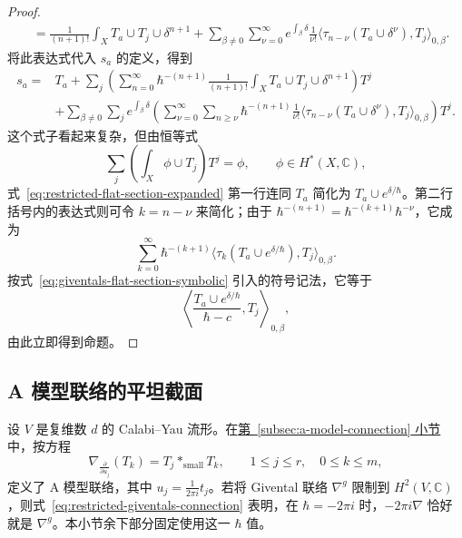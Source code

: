 \begin{proof}
\[\begin{aligned}
&=\frac1{(n+1)!}\int_XT_a\cup T_j\cup\delta^{n+1}
+\sum_{\beta\ne0}\sum_{\nu=0}^{\infty}
e^{\int_\beta\delta}\frac1{\nu!}
\langle\tau_{n-\nu}(T_a\cup\delta^\nu),T_j\rangle_{0,\beta}.
\end{aligned}
\]
将此表达式代入 $s_a$ 的定义，得到
\begin{equation}\label{eq:restricted-flat-section-expanded}
\begin{aligned}
s_a={}&T_a+\sum_j\left(\sum_{n=0}^{\infty}\hbar^{-(n+1)}
\frac1{(n+1)!}\int_XT_a\cup T_j\cup\delta^{n+1}\right)T^j\\
&+\sum_{\beta\ne0}\sum_j e^{\int_\beta\delta}
\left(\sum_{\nu=0}^{\infty}\sum_{n\ge\nu}\hbar^{-(n+1)}\frac1{\nu!}
\langle\tau_{n-\nu}(T_a\cup\delta^\nu),T_j\rangle_{0,\beta}\right)T^j.
\end{aligned}
\end{equation}
这个式子看起来复杂，但由恒等式
\begin{equation}\label{eq:poincare-dual-basis-reconstruction}
\sum_j\left(\int_X\phi\cup T_j\right)T^j=\phi,
\qquad\phi\in H^*(X,\mathbb C),
\end{equation}
式~\eqref{eq:restricted-flat-section-expanded} 第一行连同 $T_a$ 简化为 $T_a\cup e^{\delta/\hbar}$。第二行括号内的表达式则可令 $k=n-\nu$ 来简化；由于 $\hbar^{-(n+1)}=\hbar^{-(k+1)}\hbar^{-\nu}$，它成为
\[
\sum_{k=0}^{\infty}\hbar^{-(k+1)}
\langle\tau_k(T_a\cup e^{\delta/\hbar}),T_j\rangle_{0,\beta}.
\]
按式~\eqref{eq:giventals-flat-section-symbolic} 引入的符号记法，它等于
\[
\left\langle\frac{T_a\cup e^{\delta/\hbar}}{\hbar-c},T_j\right\rangle_{0,\beta},
\]
由此立即得到命题。
\end{proof}

\subsection{A 模型联络的平坦截面}\label{subsec:a-model-gravitational-flat-sections}
设 $V$ 是复维数 $d$ 的 Calabi--Yau 流形。在\hyperref[subsec:a-model-connection]{第~\ref*{subsec:a-model-connection} 小节}中，按方程
\[
\nabla_{\frac{\partial}{\partial u_j}}(T_k)=T_j*_{\mathrm{small}}T_k,
\qquad1\le j\le r,\quad0\le k\le m,
\]
定义了 A 模型联络，其中 $u_j=\frac1{2\pi i}t_j$。若将 Givental 联络 $\nabla^g$ 限制到 $H^2(V,\mathbb C)$，则式~\eqref{eq:restricted-giventals-connection} 表明，在 $\hbar=-2\pi i$ 时，$-2\pi i\nabla$ 恰好就是 $\nabla^g$。本小节余下部分固定使用这一 $\hbar$ 值。

